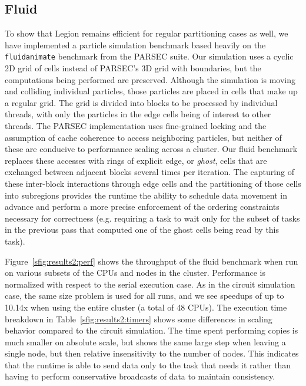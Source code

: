 

\subsection{Fluid}

To show that Legion remains efficient for regular partitioning cases as well,
we have implemented a particle simulation benchmark based heavily on the
{\tt fluidanimate} benchmark from the PARSEC \cite{bienia11benchmarking} suite.
Our simulation uses a cyclic 2D grid of cells instead of PARSEC's 3D grid with
boundaries, but the computations being performed are preserved.
Although the 
simulation is moving and colliding individual particles, those particles
are placed in cells that make up a regular grid.  The grid is
divided into blocks to be processed by individual threads, with only the
particles in the edge cells being of interest to other threads.  The PARSEC
implementation uses fine-grained locking and the assumption of cache
coherence to access neighboring particles, but neither of these are conducive
to performance scaling across a cluster.  Our fluid benchmark replaces these
accesses with rings of
explicit edge, or \emph{ghost}, cells that are exchanged between adjacent
blocks several times per iteration.  The capturing of these inter-block
interactions through edge cells and the partitioning of those cells into
subregions provides the runtime the ability to schedule data movement in
advance and perform a more precise enforcement of the ordering
constraints necessary for correctness (e.g.
requiring a task to wait only for the subset of tasks in the previous pass 
that computed one of the ghost cells being read by this task).

Figure~\ref{sfig:results2:perf} shows the throughput of the fluid benchmark when
run on various subsets of the CPUs and nodes in the cluster.  Performance is
normalized with respect to the serial execution case.  As in the circuit
simulation case, the same size problem is used for all runs, and we see 
speedups of up to 10.14x when using the entire cluster (a total of 48 CPUs).
The execution time breakdown in Table~\ref{sfig:results2:timers} shows some
differences in scaling behavior compared to the circuit simulation.  The time
spent performing copies is much smaller on absolute scale, but shows the same
large step when leaving a single node, but then relative insensitivity to the
number of nodes.  This indicates that the runtime is able to send data only to
the task that needs it rather than having to perform conservative broadcasts of
data to maintain consistency.

